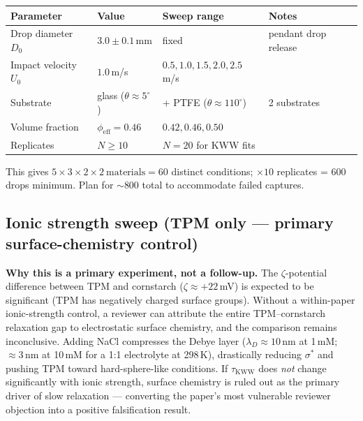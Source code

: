 \documentclass[11pt,letterpaper]{article}
\newcommand{\phieff}{\phi_{\mathrm{eff}}}
\newcommand{\taukww}{\tau_{\mathrm{KWW}}}
\newcommand{\sigstar}{\sigma^*}
\begin{document}
\begin{center}
\begin{tabular}{llll}
  \toprule
  Parameter & Value & Sweep range & Notes \\
  \midrule
  Drop diameter $D_0$ & $3.0\pm0.1$\,mm & fixed & pendant drop release \\
  Impact velocity $U_0$ & $1.0$\,m/s & $0.5, 1.0, 1.5, 2.0, 2.5$\,m/s & \\
  Substrate & glass ($\theta\approx5^\circ$) & + PTFE ($\theta\approx110^\circ$) & 2 substrates \\
  Volume fraction & $\phieff = 0.46$ & $0.42, 0.46, 0.50$ & \\
  Replicates & $N \geq 10$ & $N = 20$ for KWW fits & \\
  \bottomrule
\end{tabular}
\end{center}

This gives $5 \times 3 \times 2 \times 2~\text{materials} = 60$ distinct conditions;
$\times 10$ replicates = 600 drops minimum. Plan for ${\sim}800$ total to accommodate
failed captures.

\subsection{Ionic strength sweep (TPM only --- primary surface-chemistry control)}

\begin{gapbox}
\textbf{Why this is a primary experiment, not a follow-up.}
The $\zeta$-potential difference between TPM and cornstarch ($\zeta \approx +22$\,mV)
is expected to be significant (TPM has negatively charged surface groups). Without a
within-paper ionic-strength control, a reviewer can attribute the entire TPM--cornstarch
relaxation gap to electrostatic surface chemistry, and the comparison remains inconclusive.
Adding NaCl compresses the Debye layer ($\lambda_D \approx 10$\,nm at 1\,mM;
${\approx}3$\,nm at 10\,mM for a 1:1 electrolyte at 298\,K), drastically reducing
$\sigstar$ and pushing TPM toward hard-sphere-like conditions. If $\taukww$ does
\emph{not} change significantly with ionic strength, surface chemistry is ruled out as
the primary driver of slow relaxation --- converting the paper's most vulnerable reviewer
objection into a positive falsification result.
\end{gapbox}
\end{document}
